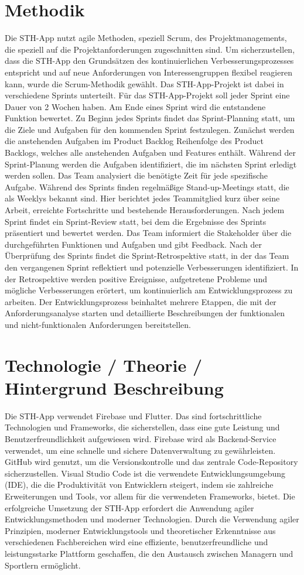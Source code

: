 \section{Methodik}
Die STH-App nutzt agile Methoden, speziell Scrum, des Projektmanagements, die speziell auf die Projektanforderungen zugeschnitten sind.
Um sicherzustellen, dass die STH-App den Grundsätzen des kontinuierlichen Verbesserungsprozesses entspricht und auf neue Anforderungen von Interessengruppen flexibel reagieren kann, wurde die Scrum-Methodik gewählt.
Das STH-App-Projekt ist dabei in verschiedene Sprints unterteilt.
Für das STH-App-Projekt soll jeder Sprint eine Dauer von 2 Wochen haben.
Am Ende eines Sprint wird die entstandene Funktion bewertet.
Zu Beginn jedes Sprints findet das Sprint-Planning statt, um die Ziele und Aufgaben für den kommenden Sprint festzulegen.
Zunächst werden die anstehenden Aufgaben im Product Backlog Reihenfolge des Product Backlogs, welches alle anstehenden Aufgaben und Features enthält.
Während der Sprint-Planung werden die Aufgaben identifiziert, die im nächsten Sprint erledigt werden sollen. Das Team analysiert die benötigte Zeit für jede spezifische Aufgabe.
Während des Sprints finden regelmäßige Stand-up-Meetings statt, die als Weeklys bekannt sind. Hier berichtet jedes Teammitglied kurz über seine Arbeit, erreichte Fortschritte und bestehende Herausforderungen.
Nach jedem Sprint findet ein Sprint-Review statt, bei dem die Ergebnisse des Sprints präsentiert und bewertet werden.
Das Team informiert die Stakeholder über die durchgeführten Funktionen und Aufgaben und gibt Feedback.
Nach der Überprüfung des Sprints findet die Sprint-Retrospektive statt, in der das Team den vergangenen Sprint reflektiert und potenzielle Verbesserungen identifiziert.
In der Retrospektive werden positive Ereignisse, aufgetretene Probleme und mögliche Verbesserungen erörtert, um kontinuierlich am Entwicklungsprozess zu arbeiten.
Der Entwicklungsprozess beinhaltet mehrere Etappen, die mit der Anforderungsanalyse starten und detaillierte Beschreibungen der funktionalen und nicht-funktionalen Anforderungen bereitstellen.
\section{Technologie / Theorie / Hintergrund Beschreibung}
Die STH-App verwendet Firebase und Flutter. Das sind fortschrittliche Technologien und Frameworks, die sicherstellen, dass eine gute Leistung und Benutzerfreundlichkeit aufgewiesen wird. Firebase wird als Backend-Service verwendet, um eine schnelle und sichere Datenverwaltung zu gewährleisten.
GitHub wird genutzt, um die Versionskontrolle und das zentrale Code-Repository sicherzustellen. Visual Studio Code ist die verwendete Entwicklungsumgebung (IDE), die die Produktivität von Entwicklern steigert, indem sie zahlreiche Erweiterungen und Tools, vor allem für die verwendeten Frameworks, bietet.
Die erfolgreiche Umsetzung der STH-App erfordert die Anwendung agiler Entwicklungsmethoden und moderner Technologien. Durch die Verwendung agiler Prinzipien, moderner Entwicklungstools und theoretischer Erkenntnisse aus verschiedenen Fachbereichen wird eine effiziente, benutzerfreundliche und leistungsstarke Plattform geschaffen, die den Austausch zwischen Managern und Sportlern ermöglicht.